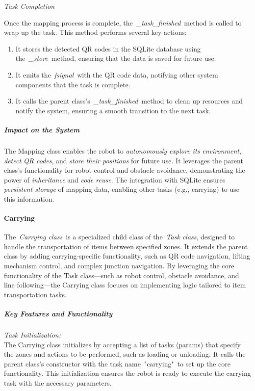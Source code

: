 \documentclass[../../main]{subfiles}
\begin{document}
\emph{Task Completion}

Once the mapping process is complete, the~\emph{\_task\_finished}~method
is called to wrap up the task. This method performs several key actions:

\begin{enumerate}
\def\labelenumi{\arabic{enumi}.}
\item
  It stores the detected QR codes in the SQLite database using
  the~\emph{\_store}~method, ensuring that the data is saved for future
  use.
\item
  It emits the~\emph{fsignal}~with the QR code data, notifying other
  system components that the task is complete.
\item
  It calls the parent class's~\emph{\_task\_finished}~method to clean up
  resources and notify the system, ensuring a smooth transition to the
  next task.
\end{enumerate}

\subparagraph{Impact on the System}

The Mapping class enables the robot to \emph{autonomously explore its
environment}, \emph{detect QR codes}, and \emph{store their positions}
for future use. It leverages the parent class's functionality for robot
control and obstacle avoidance, demonstrating the power of
\emph{inheritance} and \emph{code reuse}. The integration with SQLite
ensures \emph{persistent storage} of mapping data, enabling other tasks
(e.g., carrying) to use this information.

\paragraph{Carrying}

The~\emph{Carrying class}~is a specialized child class of the~\emph{Task
class}, designed to handle the transportation of items between specified
zones. It extends the parent class by adding carrying-specific
functionality, such as QR code navigation, lifting mechanism control,
and complex junction navigation. By leveraging the core functionality of
the Task class---such as robot control, obstacle avoidance, and line
following---the Carrying class focuses on implementing logic tailored to
item transportation tasks.

\subparagraph{Key Features and Functionality}

\emph{Task Initialization:}\\
The Carrying class initializes by accepting a list of tasks (params)
that specify the zones and actions to be performed, such as loading or
unloading. It calls the parent class's constructor with the task
name~"carrying"~to set up the core functionality. This initialization
ensures the robot is ready to execute the carrying task with the
necessary parameters.
\end{document}
